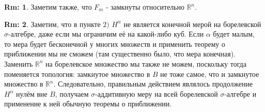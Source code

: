 \documentclass[12pt]{article}
\newcommand{\MR}{\mathbb{R}}
\theoremstyle{definition}
\newtheorem{rem}{Rm:}
\begin{document}
\begin{rem}
	Заметим также, что $F_m$ - замкнуты относительно $\MR^n$.
\end{rem}
\begin{rem}
	Заметим, что в пункте $2)$ $H^\alpha$ не является конечной мерой на борелевской $\sigma$-алгебре, даже если мы ограничим её на какой-либо куб. Если $\alpha$ будет малым, то мера будет бесконечной у многих множеств и применить теорему о приближении мы не сможем (там существенно было, что мера конечная). Заменить $\MR^n$ на борелевское множество мы также не можем, поскольку тогда поменяется топология: замкнутое множество в $B$ не тоже самое, что и замкнутое множество в $\MR^n$. Следовательно, правильным действием являлось продолжение $H^\alpha$ нулём вне $B$, получаем $\sigma$-аддитивную меру на всей борелевской $\sigma$-алгебре и применение к ней обычную теоремы о приближении.
\end{rem}
\end{document}
